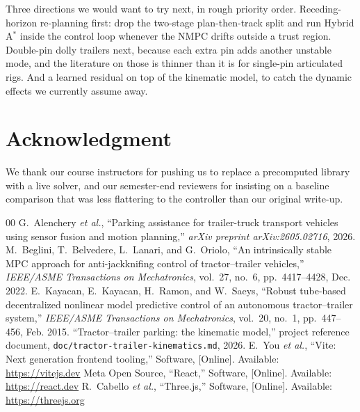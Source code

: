 \documentclass[conference]{IEEEtran}
\begin{document}
Three directions we would want to try next, in rough priority order.
Receding-horizon re-planning first: drop the two-stage plan-then-track
split and run Hybrid A$^{*}$ inside the control loop whenever the NMPC
drifts outside a trust region. Double-pin dolly trailers next, because
each extra pin adds another unstable mode, and the literature on those
is thinner than it is for single-pin articulated rigs. And a learned
residual on top of the kinematic model, to catch the dynamic effects we
currently assume away.

\section*{Acknowledgment}

We thank our course instructors for pushing us to replace a precomputed
library with a live solver, and our semester-end reviewers for insisting
on a baseline comparison that was less flattering to the controller than
our original write-up.

\begin{thebibliography}{00}
 G.~Alenchery \textit{et al.}, ``Parking assistance for trailer-truck transport vehicles using sensor fusion and motion planning,'' \textit{arXiv preprint arXiv:2605.02716}, 2026.
 M.~Beglini, T.~Belvedere, L.~Lanari, and G.~Oriolo, ``An intrinsically stable MPC approach for anti-jackknifing control of tractor--trailer vehicles,'' \textit{IEEE/ASME Transactions on Mechatronics}, vol.~27, no.~6, pp.~4417--4428, Dec. 2022.
 E.~Kayacan, E.~Kayacan, H.~Ramon, and W.~Saeys, ``Robust tube-based decentralized nonlinear model predictive control of an autonomous tractor--trailer system,'' \textit{IEEE/ASME Transactions on Mechatronics}, vol.~20, no.~1, pp.~447--456, Feb. 2015.
 ``Tractor--trailer parking: the kinematic model,'' project reference document, \texttt{doc/tractor-trailer-kinematics.md}, 2026.
 E.~You \textit{et al.}, ``Vite: Next generation frontend tooling,'' Software, [Online]. Available: \url{https://vitejs.dev}
 Meta Open Source, ``React,'' Software, [Online]. Available: \url{https://react.dev}
 R.~Cabello \textit{et al.}, ``Three.js,'' Software, [Online]. Available: \url{https://threejs.org}
\end{thebibliography}
\end{document}
